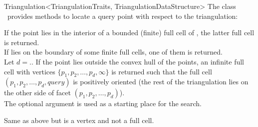 \begin{ccRefClass}{Triangulation<TriangulationTraits, TriangulationDataStructure>}
The class \ccRefName\ provides methods to locate a query point with respect to
the triangulation:

{If the point  lies in the interior of a bounded (finite) full cell of \ccVar,
the latter full cell is returned.\\
If  lies on the boundary of some finite full cells, one of them
is returned.\\
Let $d=$\ccVar.. If the point  lies
outside the convex hull of the points, an infinite full cell with vertices $\{
p_1, p_2, \ldots, p_d, \infty\}$ is returned such that the full cell $(p_1, p_2,
\ldots, p_d, query)$ is positively oriented (the rest of the triangulation lies
on the other side of facet $(p_1, p_2, \ldots, p_d)$).\\
The optional argument  is used as a starting place for the search.}

{Same as above but  is a vertex and not a full cell.}


\end{ccRefClass}
